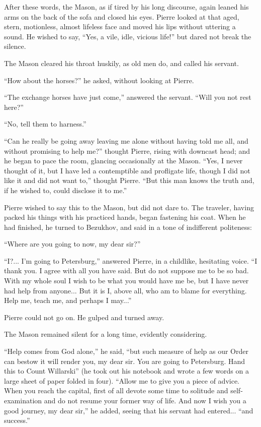 After these words, the Mason, as if tired by his long discourse,
again leaned his arms on the back of the sofa and closed his
eyes. Pierre looked at that aged, stern, motionless, almost
lifeless face and moved his lips without uttering a sound. He
wished to say, ``Yes, a vile, idle, vicious life!'' but dared not
break the silence.

The Mason cleared his throat huskily, as old men do, and called
his servant.

``How about the horses?'' he asked, without looking at Pierre.

``The exchange horses have just come,'' answered the
servant. ``Will you not rest here?''

``No, tell them to harness.''

``Can he really be going away leaving me alone without having
told me all, and without promising to help me?'' thought Pierre,
rising with downcast head; and he began to pace the room,
glancing occasionally at the Mason. ``Yes, I never thought of it,
but I have led a contemptible and profligate life, though I did
not like it and did not want to,'' thought Pierre. ``But this man
knows the truth and, if he wished to, could disclose it to me.''

Pierre wished to say this to the Mason, but did not dare to. The
traveler, having packed his things with his practiced hands,
began fastening his coat. When he had finished, he turned to
Bezukhov, and said in a tone of indifferent politeness:

``Where are you going to now, my dear sir?''

``I?... I'm going to Petersburg,'' answered Pierre, in a
childlike, hesitating voice. ``I thank you. I agree with all you
have said. But do not suppose me to be so bad. With my whole soul
I wish to be what you would have me be, but I have never had help
from anyone... But it is I, above all, who am to blame for
everything. Help me, teach me, and perhaps I may...''

Pierre could not go on. He gulped and turned away.

The Mason remained silent for a long time, evidently considering.

``Help comes from God alone,'' he said, ``but such measure of
help as our Order can bestow it will render you, my dear sir. You
are going to Petersburg. Hand this to Count Willarski'' (he took
out his notebook and wrote a few words on a large sheet of paper
folded in four). ``Allow me to give you a piece of advice. When
you reach the capital, first of all devote some time to solitude
and self-examination and do not resume your former way of
life. And now I wish you a good journey, my dear sir,'' he added,
seeing that his servant had entered... ``and success.''

